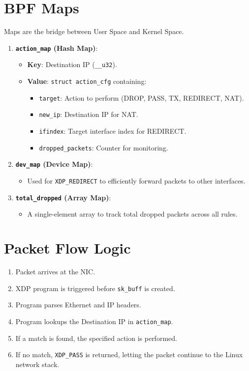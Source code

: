 \documentclass[11pt,a4paper]{report}
\begin{document}
\chapter{BPF Maps}

Maps are the bridge between User Space and Kernel Space.

\begin{enumerate}
    \item \textbf{\texttt{action\_map} (Hash Map)}:
    \begin{itemize}
        \item \textbf{Key}: Destination IP (\texttt{\_\_u32}).
        \item \textbf{Value}: \texttt{struct action\_cfg} containing:
        \begin{itemize}
            \item \texttt{target}: Action to perform (DROP, PASS, TX, REDIRECT, NAT).
            \item \texttt{new\_ip}: Destination IP for NAT.
            \item \texttt{ifindex}: Target interface index for REDIRECT.
            \item \texttt{dropped\_packets}: Counter for monitoring.
        \end{itemize}
    \end{itemize}
    \item \textbf{\texttt{dev\_map} (Device Map)}:
    \begin{itemize}
        \item Used for \texttt{XDP\_REDIRECT} to efficiently forward packets to other interfaces.
    \end{itemize}
    \item \textbf{\texttt{total\_dropped} (Array Map)}:
    \begin{itemize}
        \item A single-element array to track total dropped packets across all rules.
    \end{itemize}
\end{enumerate}

\chapter{Packet Flow Logic}

\begin{enumerate}
    \item Packet arrives at the NIC.
    \item XDP program is triggered before \texttt{sk\_buff} is created.
    \item Program parses Ethernet and IP headers.
    \item Program lookups the Destination IP in \texttt{action\_map}.
    \item If a match is found, the specified action is performed.
    \item If no match, \texttt{XDP\_PASS} is returned, letting the packet continue to the Linux network stack.
\end{enumerate}
\end{document}
